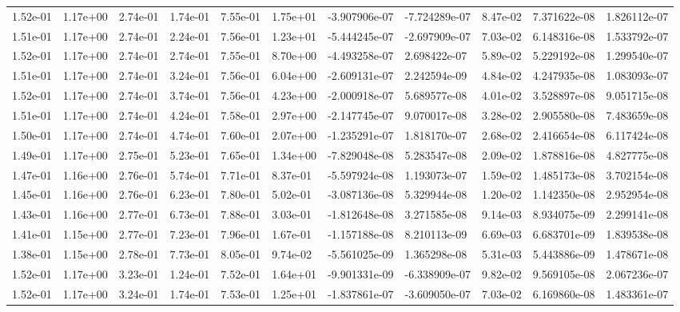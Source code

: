 \begin{longtable}{| p{} | p{} |}
1.52e-01 & 1.17e+00 & 2.74e-01 & 1.74e-01 & 7.55e-01 & 1.75e+01 & -3.907906e-07 & -7.724289e-07 &  8.47e-02 &  7.371622e-08 &  1.826112e-07 \\
1.51e-01 & 1.17e+00 & 2.74e-01 & 2.24e-01 & 7.56e-01 & 1.23e+01 & -5.444245e-07 & -2.697909e-07 &  7.03e-02 &  6.148316e-08 &  1.533792e-07 \\
1.52e-01 & 1.17e+00 & 2.74e-01 & 2.74e-01 & 7.55e-01 & 8.70e+00 & -4.493258e-07 &  2.698422e-07 &  5.89e-02 &  5.229192e-08 &  1.299540e-07 \\
1.51e-01 & 1.17e+00 & 2.74e-01 & 3.24e-01 & 7.56e-01 & 6.04e+00 & -2.609131e-07 &  2.242594e-09 &  4.84e-02 &  4.247935e-08 &  1.083093e-07 \\
1.52e-01 & 1.17e+00 & 2.74e-01 & 3.74e-01 & 7.56e-01 & 4.23e+00 & -2.000918e-07 &  5.689577e-08 &  4.01e-02 &  3.528897e-08 &  9.051715e-08 \\
1.51e-01 & 1.17e+00 & 2.74e-01 & 4.24e-01 & 7.58e-01 & 2.97e+00 & -2.147745e-07 &  9.070017e-08 &  3.28e-02 &  2.905580e-08 &  7.483659e-08 \\
1.50e-01 & 1.17e+00 & 2.74e-01 & 4.74e-01 & 7.60e-01 & 2.07e+00 & -1.235291e-07 &  1.818170e-07 &  2.68e-02 &  2.416654e-08 &  6.117424e-08 \\
1.49e-01 & 1.17e+00 & 2.75e-01 & 5.23e-01 & 7.65e-01 & 1.34e+00 & -7.829048e-08 &  5.283547e-08 &  2.09e-02 &  1.878816e-08 &  4.827775e-08 \\
1.47e-01 & 1.16e+00 & 2.76e-01 & 5.74e-01 & 7.71e-01 & 8.37e-01 & -5.597924e-08 &  1.193073e-07 &  1.59e-02 &  1.485173e-08 &  3.702154e-08 \\
1.45e-01 & 1.16e+00 & 2.76e-01 & 6.23e-01 & 7.80e-01 & 5.02e-01 & -3.087136e-08 &  5.329944e-08 &  1.20e-02 &  1.142350e-08 &  2.952954e-08 \\
1.43e-01 & 1.16e+00 & 2.77e-01 & 6.73e-01 & 7.88e-01 & 3.03e-01 & -1.812648e-08 &  3.271585e-08 &  9.14e-03 &  8.934075e-09 &  2.299141e-08 \\
1.41e-01 & 1.15e+00 & 2.77e-01 & 7.23e-01 & 7.96e-01 & 1.67e-01 & -1.157188e-08 &  8.210113e-09 &  6.69e-03 &  6.683701e-09 &  1.839538e-08 \\
1.38e-01 & 1.15e+00 & 2.78e-01 & 7.73e-01 & 8.05e-01 & 9.74e-02 & -5.561025e-09 &  1.365298e-08 &  5.31e-03 &  5.443886e-09 &  1.478671e-08 \\
1.52e-01 & 1.17e+00 & 3.23e-01 & 1.24e-01 & 7.52e-01 & 1.64e+01 & -9.901331e-09 & -6.338909e-07 &  9.82e-02 &  9.569105e-08 &  2.067236e-07 \\
1.52e-01 & 1.17e+00 & 3.24e-01 & 1.74e-01 & 7.53e-01 & 1.25e+01 & -1.837861e-07 & -3.609050e-07 &  7.03e-02 &  6.169860e-08 &  1.483361e-07 \\

\end{longtable}
